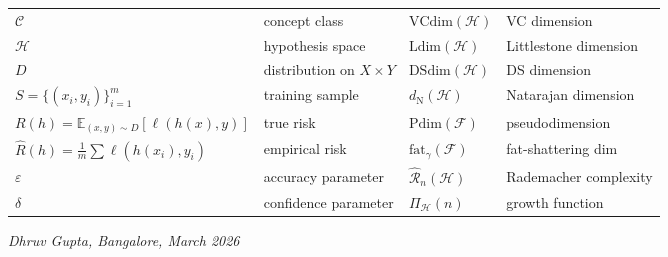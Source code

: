 \documentclass[11pt,a4paper,twoside,openright]{book}
\theoremstyle{definition}
\theoremstyle{plain}
\theoremstyle{remark}
\newcommand{\VC}{\ensuremath{\mathrm{VCdim}}}
\newcommand{\Ldim}{\ensuremath{\mathrm{Ldim}}}
\newcommand{\DSdim}{\ensuremath{\mathrm{DSdim}}}
\newcommand{\Ndim}{\ensuremath{d_{\mathrm{N}}}}
\newcommand{\Pdim}{\ensuremath{\mathrm{Pdim}}}
\newcommand{\fatshat}{\ensuremath{\mathrm{fat}}}
\newcommand{\Rad}{\ensuremath{\widehat{\mathcal{R}}}}
\newcommand{\E}{\ensuremath{\mathbb{E}}}
\newcommand{\risk}{\ensuremath{R}}
\newcommand{\emprisk}{\ensuremath{\hat{R}}}
\newcommand{\growth}{\ensuremath{\Pi}}
\begin{document}
\begin{center}\small
\begin{tabular}{ll@{\qquad}ll}
\toprule
$\mathcal{C}$ & concept class & $\VC(\mathcal{H})$ & VC dimension \\
$\mathcal{H}$ & hypothesis space & $\Ldim(\mathcal{H})$ & Littlestone dimension \\
$D$ & distribution on $X \times Y$ & $\DSdim(\mathcal{H})$ & DS dimension \\
$S = \{(x_i, y_i)\}_{i=1}^m$ & training sample & $\Ndim(\mathcal{H})$ & Natarajan dimension \\
$\risk(h) = \E_{(x,y) \sim D}[\ell(h(x),y)]$ & true risk & $\Pdim(\mathcal{F})$ & pseudodimension \\
$\emprisk(h) = \frac{1}{m}\sum \ell(h(x_i),y_i)$ & empirical risk & $\fatshat_\gamma(\mathcal{F})$ & fat-shattering dim \\
$\varepsilon$ & accuracy parameter & $\Rad_n(\mathcal{H})$ & Rademacher complexity \\
$\delta$ & confidence parameter & $\growth_\mathcal{H}(n)$ & growth function \\
\bottomrule
\end{tabular}
\end{center}

\vspace{1em}
\hfill \textit{Dhruv Gupta, Bangalore, March 2026}

\tableofcontents

\listoffigures
{}

\listoftables
{}

\mainmatter




















\appendix






\backmatter



\end{document}
